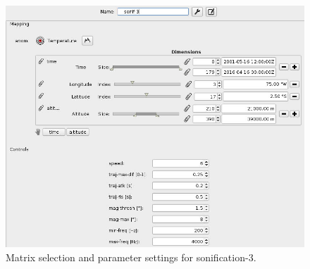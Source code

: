 \documentclass[11pt,a4paper]{article}
\begin{document}
\begin{figure}
\includegraphics[width=\textwidth]{figures/sonif-3-editor-shot.jpg}
\caption{Matrix selection and parameter settings for sonification-3.}
\label{fig:sonif-3-editor-shot.jpg}
\end{figure}

\end{document}
